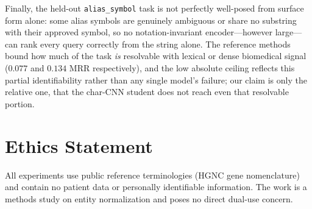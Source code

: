 \documentclass[11pt]{article}
\begin{document}
Finally, the held-out \texttt{alias\_symbol} task is not perfectly well-posed from
surface form alone: some alias symbols are genuinely ambiguous or share no
substring with their approved symbol, so no notation-invariant encoder---however
large---can rank every query correctly from the string alone. The reference
methods bound how much of the task \emph{is} resolvable with lexical or dense
biomedical signal ($0.077$ and $0.134$ MRR respectively), and the low absolute
ceiling reflects this partial identifiability rather than any single model's
failure; our claim is only the relative one, that the char-CNN student does not
reach even that resolvable portion.

\section*{Ethics Statement}
All experiments use public reference terminologies (HGNC gene nomenclature) and
contain no patient data or personally identifiable information. The work is a
methods study on entity normalization and poses no direct dual-use concern.


\end{document}
